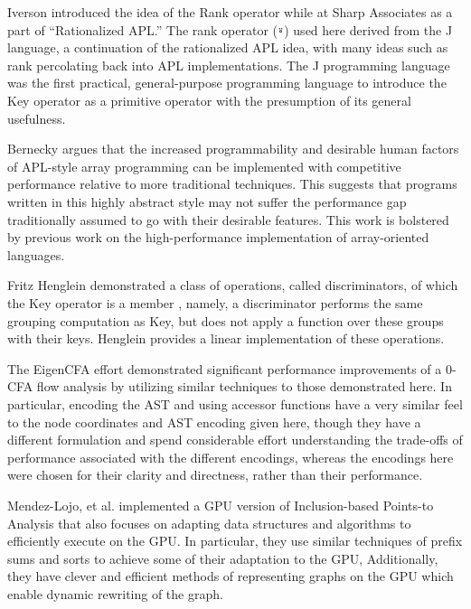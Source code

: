\documentclass[numbers,preprint]{sigplanconf}
\begin{document}
Iverson introduced the idea of the Rank operator while at Sharp Associates 
\cite{iverson1983rationalized} as a part of ``Rationalized APL.'' 
The rank operator (\verb;⍤;) used here derived from the J language, a 
continuation of the rationalized APL idea, with many ideas such as rank 
percolating back into APL implementations. \cite{bernecky1987rank,hui1995rank}
The J programming language \cite{hui2014key} was the first practical,
general-purpose programming language to introduce the Key operator as a
primitive operator with the presumption of its general usefulness.

Bernecky \cite{bernecky2015abstract} argues that the increased programmability 
and desirable human factors of APL-style array programming can be implemented 
with competitive performance relative to more traditional techniques. This 
suggests that programs written in this highly abstract style may not suffer the 
performance gap traditionally assumed to go with their desirable features. 
This work is bolstered by previous work on the high-performance implementation 
of array-oriented languages. 
\cite{ching1994experimental,ching1993primitive,
ching1990automatic,ju1991exploitation,
ju1991performance,bernecky1999reducing,schwarz1991acorn}

Fritz Henglein demonstrated a class of operations, called
discriminators, of which the Key operator is a member  
\cite{henglein2013dd}
, namely,
a discriminator performs the same grouping computation as Key, but
does not apply a function over these groups with their keys. Henglein
provides a linear implementation of these operations.

The EigenCFA effort \cite{prabhu2011eigencfa} demonstrated significant performance
improvements of a 0-CFA flow analysis by utilizing similar techniques
to those demonstrated here. In particular, encoding the AST and using
accessor functions have a very similar feel to the node coordinates and
AST encoding given here, though they have a different formulation and
spend considerable effort understanding the trade-offs of performance
associated with the different encodings, whereas the encodings here
were chosen for their clarity and directness, rather than their
performance.

Mendez-Lojo, et al. implemented a GPU version of Inclusion-based
Points-to Analysis \cite{mendez2012inclusion} that also focuses on 
adapting data structures
and algorithms to efficiently execute on the GPU. In particular,
they use similar techniques of prefix sums and sorts to achieve some
of their adaptation to the GPU, Additionally, they have clever and
efficient methods of representing graphs on the GPU which enable
dynamic rewriting of the graph.
\end{document}
